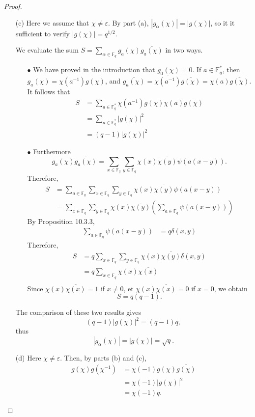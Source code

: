 \documentclass[11pt,a4paper]{article}
\newcommand{\F}{\mathbb{F}}
\begin{document}
\begin{proof}
\begin{enumerate}
\item[(c)]Here we assume that $\chi \ne \varepsilon$.  By part (a), $|g_\alpha(\chi)| = |g(\chi)|$, so it it sufficient to verify $|g(\chi) | = q^{1/2}$.

We evaluate the sum $S = \sum_{\alpha \in \F_q} g_a(\chi) \overline{g_a(\chi)}$ in two ways.

\begin{enumerate}
\item[$\bullet$]  We have proved in the introduction that $g_0(\chi) = 0$. If $a \in \F_q^*$, then $g_a(\chi) = \chi(a^{-1}) g(\chi)$, and $\overline{g_a(\chi)} = \overline{\chi(a^{-1})} \overline{g(\chi)} = \chi(a) \overline{g(\chi)}$. It follows that
\begin{align*}
S&= \sum_{a \in \F_q^*} \chi(a^{-1}) g(\chi)  \chi(a) \overline{g(\chi)}\\
&= \sum_{a \in \F_q^*} |g(\chi)|^2\\
&= (q-1) |g(\chi)|^2
\end{align*}
\item[$\bullet$] Furthermore $$g_a(\chi) \overline{g_a(\chi)} = \sum_{x \in \F_q} \sum_{y \in \F_q} \chi(x) \overline{\chi(y)} \psi(a(x-y)).$$
Therefore,
\begin{align*}
S &= \sum_{a\in \F_q}  \sum_{x \in \F_q} \sum_{y \in \F_q} \chi(x) \overline{\chi(y)} \psi(a(x-y))\\
&=  \sum_{x \in \F_q} \sum_{y \in \F_q}\chi(x) \overline{\chi(y)} \left(  \sum_{a\in \F_q}\psi(a(x-y))\right)
\end{align*}
By Proposition 10.3.3,
\begin{align*}
 \sum_{a\in \F_q} \psi(a(x-y)) &= q \delta(x,y)
  \end{align*}
Therefore,
 \begin{align*}
 S &=  q \sum_{x \in \F_q} \sum_{y \in \F_q}\chi(x) \overline{\chi(y)}  \delta(x,y) \\
 &= q \sum_{x \in \F_q} \chi(x) \overline{\chi(x)}\\
 \end{align*}
Since $\chi(x) \overline{\chi(x)} = 1$ if $x \ne 0$, et $\chi(x) \overline{\chi(x)} = 0$ if $x = 0$, we obtain
 $$S = q(q-1).$$
\end{enumerate}
The comparison of these two results gives
$$(q-1) |g(\chi)|^2 = (q-1)q,$$
thus $$ |g_\alpha(\chi)| = |g(\chi)| = \sqrt{q}.$$

\item[(d)] Here $\chi \ne \varepsilon$. Then, by parts (b) and (c),
\begin{align*}
g(\chi) g(\chi^{-1}) &= \chi(-1) g(\chi) \overline{g(\chi)}\\
&=\chi(-1) |g(\chi)|^2\\
&= \chi(-1) q.
\end{align*}
\end{enumerate}
\end{proof}
\end{document}
